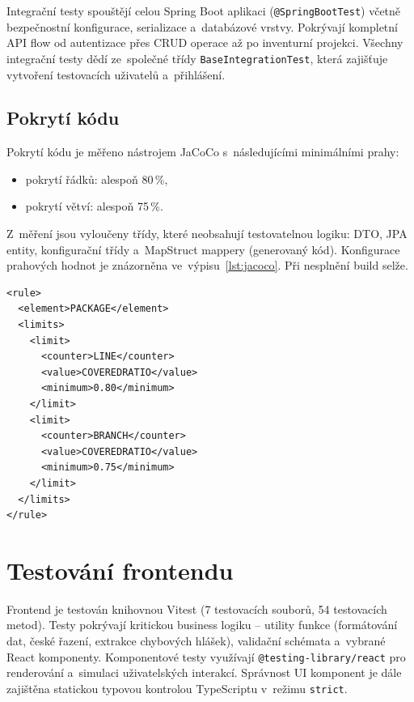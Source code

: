Integrační testy spouštějí celou Spring Boot aplikaci (\texttt{@SpringBootTest}) včetně bezpečnostní konfigurace, serializace a~databázové vrstvy. Pokrývají kompletní API flow od autentizace přes CRUD operace až po inventurní projekci. Všechny integrační testy dědí ze~společné třídy \texttt{BaseIntegrationTest}, která zajišťuje vytvoření testovacích uživatelů a~přihlášení.

\subsection{Pokrytí kódu}

Pokrytí kódu je měřeno nástrojem JaCoCo s~následujícími minimálními prahy:

\begin{itemize}
	\item pokrytí řádků: alespoň 80\,\%,
	\item pokrytí větví: alespoň 75\,\%.
\end{itemize}

Z~měření jsou vyloučeny třídy, které neobsahují testovatelnou logiku: DTO, JPA entity, konfigurační třídy a~MapStruct mappery (generovaný kód). Konfigurace prahových hodnot je znázorněna ve~výpisu~\ref{lst:jacoco}. Při nesplnění build selže.

\begin{listing}[H]
\caption{Konfigurace JaCoCo -- minimální pokrytí kódu}\label{lst:jacoco}
\begin{verbatim}
<rule>
  <element>PACKAGE</element>
  <limits>
    <limit>
      <counter>LINE</counter>
      <value>COVEREDRATIO</value>
      <minimum>0.80</minimum>
    </limit>
    <limit>
      <counter>BRANCH</counter>
      <value>COVEREDRATIO</value>
      <minimum>0.75</minimum>
    </limit>
  </limits>
</rule>
\end{verbatim}
\end{listing}

\section{Testování frontendu}

Frontend je testován knihovnou Vitest (7 testovacích souborů, 54 testovacích metod). Testy pokrývají kritickou business logiku -- utility funkce (formátování dat, české řazení, extrakce chybových hlášek), validační schémata a~vybrané React komponenty. Komponentové testy využívají \texttt{@testing-library/react} pro renderování a~simulaci uživatelských interakcí. Správnost UI komponent je dále zajištěna statickou typovou kontrolou TypeScriptu v~režimu \texttt{strict}.

